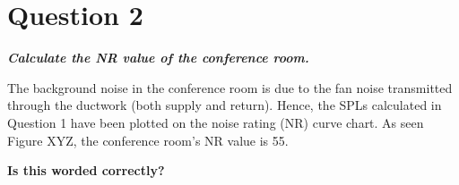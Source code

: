 \section{Question 2}

\textit{\textbf{Calculate the NR value of the conference room.}}

The background noise in the conference room is due to the fan noise transmitted through the ductwork (both supply and return).
Hence, the SPLs calculated in Question 1 have been plotted on the noise rating (NR) curve chart.
As seen Figure XYZ, the conference room's NR value is 55.

\textbf{Is this worded correctly?}
